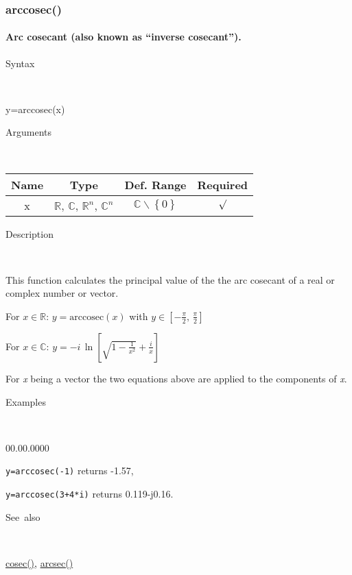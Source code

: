 \subsubsection*{\hypertarget{arccosec}{}{\Large arccosec()}}


\paragraph{\label{par:Arc-cosec}Arc cosecant (also known as {}``inverse cosecant'').}

\begin{description}
\item [Syntax]~
\end{description}
y=arccosec(x)

\begin{description}
\item [Arguments]~
\end{description}
\begin{tabular}{|c|c|c|c|}
\hline 
Name&
Type&
Def. Range&
Required\tabularnewline
\hline
\hline 
x&
$\mathbb{R}$, $\mathbb{C}$, $\mathbb{R}^{n}$, $\mathbb{C}^{n}$&
$\mathbb{C}\backslash \left\lbrace 0\right\rbrace $&
$\surd$\tabularnewline
\hline
\end{tabular}

\begin{description}
\item [Description]~
\end{description}
This function calculates the principal value of the the arc cosecant of
a real or complex number or vector.

\medskip{}
For $x\in\mathbb{R}$: $y=\textrm{arccosec}\left( x\right) $ with $y\in\left[ -\frac{\pi}{2},\,\frac{\pi}{2}\right] $

\medskip{}
For $x\in\mathbb{C}$: $y=-i\,\ln\left[\sqrt{1-\frac{1}{x^{2}}}+\frac{i}{x}\right]$
\medskip{}

For \textit{x} being a vector the two equations above are
applied to the components of \textit{x}.

\begin{description}
\item [Examples]~
\end{description}
\begin{lyxlist}{00.00.0000}
\item [\texttt{y=arccosec(-1)}]returns -1.57,
\item [\texttt{y=arccosec(3+4{*}i)}]returns 0.119-j0.16.
\end{lyxlist}
\begin{description}
\item [See~also]~
\end{description}
\textcolor{blue}{\hyperlink{cosec}{cosec()}}\textcolor{black}{,} \textcolor{blue}{\hyperlink{arcsec}{arcsec()}}


